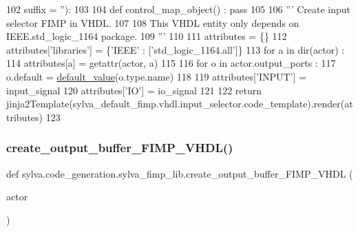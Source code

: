 \begin{DoxyCode}
102     suffix = \textcolor{stringliteral}{''}):
103 
104     \textcolor{keyword}{def }control\_map\_object() : \textcolor{keyword}{pass}
105 
106     \textcolor{stringliteral}{''' Create input selector FIMP in VHDL.}
107 \textcolor{stringliteral}{}
108 \textcolor{stringliteral}{    This VHDL entity only depends on IEEE.std\_logic\_1164 package.}
109 \textcolor{stringliteral}{    '''}
110 
111     attributes = \{\}
112     attributes[\textcolor{stringliteral}{'libraries'}] = \{\textcolor{stringliteral}{'IEEE'} : [\textcolor{stringliteral}{'std\_logic\_1164.all'}]\}
113     \textcolor{keywordflow}{for} a \textcolor{keywordflow}{in} dir(actor) :
114       attributes[a] = getattr(actor, a)
115 
116     \textcolor{keywordflow}{for} o \textcolor{keywordflow}{in} actor.output\_ports :
117       o.default = \hyperlink{namespacesylva_1_1code__generation_1_1sylva__fimp__lib_a7ade6c6728b5e51bbbbfef039fc718cc}{default\_value}(o.type.name)
118 
119     attributes[\textcolor{stringliteral}{'INPUT'}] = input\_signal
120     attributes[\textcolor{stringliteral}{'IO'}] = io\_signal
121 
122     \textcolor{keywordflow}{return} jinja2Template(sylva\_default\_fimp.vhdl.input\_selector.code\_template).render(attributes)
123 
\end{DoxyCode}
\mbox{\label{namespacesylva_1_1code__generation_1_1sylva__fimp__lib_a66cabf05c0d2dc8b7957560a0075b5d8}} 
\subsubsection{\texorpdfstring{create\+\_\+output\+\_\+buffer\+\_\+\+F\+I\+M\+P\+\_\+\+V\+H\+D\+L()}{create\_output\_buffer\_FIMP\_VHDL()}}
{\footnotesize\ttfamily def sylva.\+code\+\_\+generation.\+sylva\+\_\+fimp\+\_\+lib.\+create\+\_\+output\+\_\+buffer\+\_\+\+F\+I\+M\+P\+\_\+\+V\+H\+DL (\begin{DoxyParamCaption}\item[{}]{actor }\end{DoxyParamCaption})}

